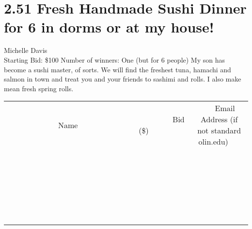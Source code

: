 \documentclass[11pt]{article}
\begin{document}
\section*{2.51 Fresh Handmade Sushi Dinner for 6 in dorms or at my house!}
Michelle Davis
\\
Starting Bid: \$100
\newline
Number of winners: One (but for 6 people)
\newline
My son has become a sushi master, of sorts. We will find the freshest tuna, hamachi and salmon in town and treat you and your friends to sashimi and rolls. I also make mean fresh spring rolls.
\\[6ex]
\begin{tabular}{c c c}
~~~~~~~~~~~~~Name~~~~~~~~~~~~~ & ~~~~~~~~~Bid (\$)~~~~~~~~~  & ~~~Email Address (if not standard olin.edu)~~~\\
 & & \\
\hline
 & & \\
\hline
 & & \\
\hline
 & & \\
\hline
 & & \\
\hline
 & & \\
\hline
 & & \\
\hline
 & & \\
\hline
 & & \\
\hline
 & & \\
\hline
 & & \\
\hline
 & & \\
\hline
 & & \\
\hline
 & & \\
\hline
 & & \\
\hline
 & & \\
\hline
 & & \\
\hline
 & & \\
\hline
 & & \\
\hline
 & & \\
\hline
 & & \\
\hline
 & & \\
\hline
 & & \\
\hline
 & & \\
\hline
 & & \\
\hline
 & & \\
\hline
\end{tabular}
\newpage
\end{document}
